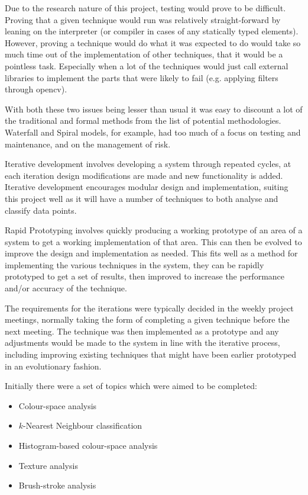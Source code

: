 Due to the research nature of this project, testing would prove to be difficult. Proving that a
given technique would run was relatively straight-forward by leaning on the interpreter (or 
compiler in cases of any statically typed elements). However, proving a technique would do what it was
expected to do would take so much time out of the implementation of other techniques, that it would be a 
pointless task. Especially when a lot of the techniques would just call external libraries to
implement the parts that were likely to fail (e.g. applying filters through \gls{opencv}).

With both these two issues being lesser than usual it was easy to discount a lot of the traditional
and formal methods from the list of potential methodologies. Waterfall and Spiral models, for 
example, had too much of a focus on testing and maintenance, and on the management of risk.

Iterative development involves developing a system through repeated cycles, at each iteration 
design modifications are made and new functionality is added. Iterative development encourages 
modular design and implementation, suiting this project well as it will have a number of 
techniques to both analyse and classify data points.

Rapid Prototyping involves quickly producing a working prototype of an area of a system to get a
working implementation of that area. This can then be evolved to improve the design and 
implementation as needed. This fits well as a method for implementing the various techniques in 
the system, they can be rapidly prototyped to get a set of results, then improved to increase the
performance and/or accuracy of the technique.

The requirements for the iterations were typically decided in the weekly project meetings, normally 
taking the form of completing a given technique before the next meeting. The technique
was then implemented as a prototype and any adjustments would be made to the system in line with
the iterative process, including improving existing techniques that might have been earlier 
prototyped in an evolutionary fashion.

Initially there were a set of topics which were aimed to be completed:

\begin{itemize}
\item Colour-space analysis
\item $k$-Nearest Neighbour classification
\item Histogram-based colour-space analysis
\item Texture analysis
\item Brush-stroke analysis
\end{itemize}

